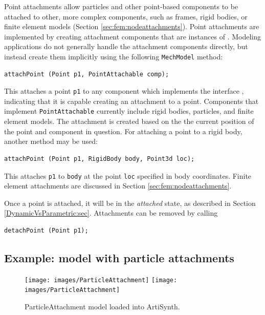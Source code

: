 Point attachments allow particles and other point-based components to
be attached to other, more complex components, such as frames, rigid
bodies, or finite element models (Section \ref{sec:fem:nodeattachments}). Point
attachments are implemented by creating attachment components that are
instances of .
Modeling applications do not generally handle the attachment
components directly, but instead create them implicitly using the
following {\tt MechModel} method:
\begin{lstlisting}[]
  attachPoint (Point p1, PointAttachable comp);
\end{lstlisting}
%
This attaches a point {\tt p1} to any component which implements the
interface ,
indicating that it is capable creating an attachment to a
point. Components that implement {\tt PointAttachable} currently
include rigid bodies, particles, and finite element models. The
attachment is created based on the the current position of the point
and component in question.  For attaching a point to a rigid body,
another method may be used:
\begin{lstlisting}[]
  attachPoint (Point p1, RigidBody body, Point3d loc);
\end{lstlisting}
%
This attaches {\tt p1} to {\tt body} at the point {\tt loc} specified
in body coordinates.  Finite element attachments are discussed in
Section \ref{sec:fem:nodeattachments}.

Once a point is attached, it
will be in the {\it attached} state, as described in Section
\ref{DynamicVsParametric:sec}.  Attachments can be removed by
calling
\begin{lstlisting}[]
  detachPoint (Point p1);   
\end{lstlisting}
%

\subsection{Example: model with particle attachments}

\begin{figure}[ht]
\begin{center}
\iflatexml
 \texttt{[image: images/ParticleAttachment]}
\else
 \texttt{[image: images/ParticleAttachment]}
\fi
\end{center}
\caption{ParticleAttachment model loaded into ArtiSynth.}
\label{ParticleAttachment:fig}
\end{figure}

